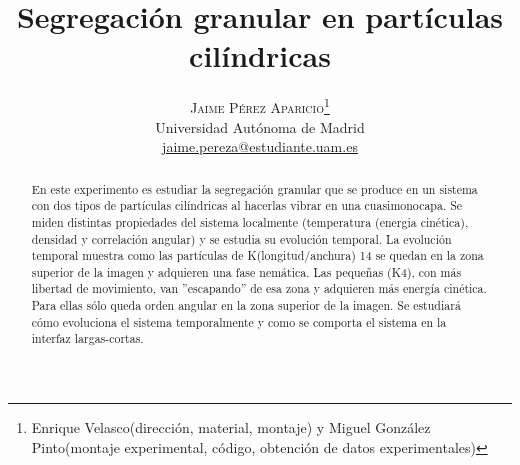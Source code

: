\documentclass[twoside]{article}
\title{\vspace{-15mm}\fontsize{24pt}{10pt}\selectfont\textbf{Segregaci\'on granular en part\'iculas cil\'indricas}} %
\author{
\large
\textsc{Jaime P\'erez Aparicio}\thanks{Enrique Velasco(direcci\'on, material, montaje) y Miguel Gonz\'alez Pinto(montaje experimental, c\'odigo, obtenci\'on de datos experimentales)}\\[2mm] %
\normalsize Universidad Aut\'onoma de Madrid \\ %
\normalsize \href{mailto:jaime.pereza@estudiante.uam.es}{jaime.pereza@estudiante.uam.es} %
\vspace{-5mm}
}
\date{}
\begin{document}
\maketitle %

\thispagestyle{fancy} %


\begin{abstract}

\noindent En este experimento es estudiar la segregaci\'on granular que se produce en un sistema con dos tipos de part\'iculas cil\'indricas al hacerlas vibrar en una cuasimonocapa. Se miden distintas propiedades del sistema localmente (temperatura (energia cin\'etica), densidad y correlaci\'on angular) y se estudia su evoluci\'on temporal. La evoluci\'on temporal muestra como las part\'iculas de K(longitud/anchura) 14 se quedan en la zona superior de la imagen y adquieren una fase nem\'atica. Las peque\~nas (K4), con m\'as libertad de movimiento, van ''escapando'' de esa zona y adquieren m\'as energ\'ia cin\'etica. Para ellas s\'olo queda orden angular en la zona superior de la imagen. Se estudiar\'a c\'omo evoluciona el sistema temporalmente y como se comporta el sistema en la interfaz largas-cortas.

\end{abstract}

\end{document}
